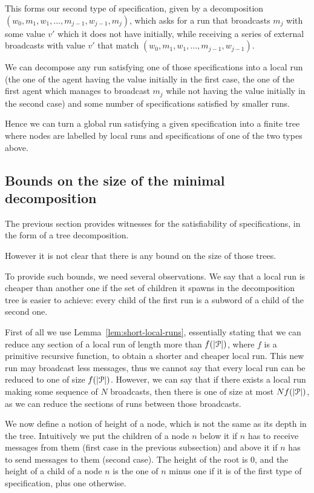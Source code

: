 \begin{itemize}
	This forms our second type of specification, given by a decomposition $(w_0, m_1, w_1, \ldots, m_{j-1}, w_{j-1}, m_j)$, which asks for a run that broadcasts $m_j$ with some value $v'$ which it does not have initially, while receiving a series of  external broadcasts with value $v'$ that match $(w_0, m_1, w_1, \ldots, m_{j-1}, w_{j-1})$.
\end{itemize}   

We can decompose any run satisfying one of those specifications into a local run (the one of the agent having the value initially in the first case, the one of the first agent which manages to broadcast $m_j$ while not having the value initially in the second case) and some number of specifications satisfied by smaller runs.

Hence we can turn a global run satisfying a given specification into a finite tree where nodes are labelled by local runs and specifications of one of the two types above.

\subsection{Bounds on the size of the minimal decomposition}

The previous section provides witnesses for the satisfiability of specifications, in the form of a tree decomposition.

However it is not clear that there is any bound on the size of those trees.

To provide such bounds, we need several observations.
We say that a local run is cheaper than another one if the set of children it spawns in the decomposition tree is easier to achieve: every child of the first run is a subword of a child of the second one.

 First of all we use Lemma~\ref{lem:short-local-runs}, essentially stating that we can reduce any section of a local run of length more than $f(|\mathcal{P}|)$, where $f$ is a primitive recursive function, to obtain a shorter and cheaper local run.
 This new run may broadcast less messages, thus we cannot say that every local run can be reduced to one of size $f(|\mathcal{P}|)$.
 However, we can say that if there exists a local run making some sequence of $N$ broadcasts, then there is one of size at most $Nf(|\mathcal{P}|)$, as we can reduce the sections of runs between those broadcasts.
 
 We now define a notion of height of a node, which is not the same as its depth in the tree. Intuitively we put the children of a node $n$ below it if $n$ has to receive messages from them (first case in the previous subsection) and above it if $n$ has to send messages to them (second case).
 The height of the root is $0$, and the height of a child of a node $n$  is  the one of $n$ minus one if it is of the first type of specification, plus one otherwise.
 
